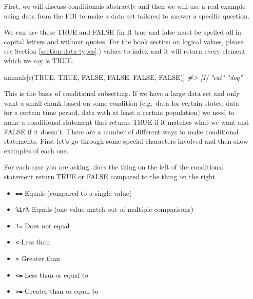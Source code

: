 \documentclass[
]{krantz}
\makeatletter
\newenvironment{Shaded}{\begin{snugshade}}{\end{snugshade}}
\newcommand{\CommentTok}[1]{\textcolor[rgb]{0.37,0.37,0.37}{\textit{#1}}}
\newcommand{\ConstantTok}[1]{\textcolor[rgb]{0,0,0}{#1}}
\newcommand{\FunctionTok}[1]{\textcolor[rgb]{0,0,0}{#1}}
\newcommand{\NormalTok}[1]{#1}
\providecommand{\tightlist}{%
  \setlength{\itemsep}{0pt}\setlength{\parskip}{0pt}}
\newenvironment{kframe}{%
\medskip{}
\setlength{\fboxsep}{.8em}
 \def\at@end@of@kframe{}%
 \ifinner\ifhmode%
  \def\at@end@of@kframe{\end{minipage}}%
  \begin{minipage}{\columnwidth}%
 \fi\fi%
 \def\FrameCommand##1{\hskip\@totalleftmargin \hskip-\fboxsep
 \colorbox{shadecolor}{##1}\hskip-\fboxsep
     \hskip-\linewidth \hskip-\@totalleftmargin \hskip\columnwidth}%
 \MakeFramed {\advance\hsize-\width
   \@totalleftmargin\z@ \linewidth\hsize
   \@setminipage}}%
 {\par\unskip\endMakeFramed%
 \at@end@of@kframe}
\renewenvironment{Shaded}{\begin{kframe}}{\end{kframe}}
\makeatother
\begin{document}
First, we will discuss conditionals abstractly and then we will use a real example using data from the FBI to make a data set tailored to answer a specific question.

We can use these TRUE and FALSE (in R true and false must be spelled all in capital letters and without quotes. For the book section on logical values, please see Section \ref{section-data-types}.) values to index and it will return every element which we say is TRUE.

\begin{Shaded}
\begin{Highlighting}[]
\NormalTok{animals[}\FunctionTok{c}\NormalTok{(}\ConstantTok{TRUE}\NormalTok{, }\ConstantTok{TRUE}\NormalTok{, }\ConstantTok{FALSE}\NormalTok{, }\ConstantTok{FALSE}\NormalTok{, }\ConstantTok{FALSE}\NormalTok{, }\ConstantTok{FALSE}\NormalTok{)]}
\CommentTok{\#\textgreater{} [1] "cat" "dog"}
\end{Highlighting}
\end{Shaded}

This is the basis of conditional subsetting. If we have a large data set and only want a small chunk based on some condition (e.g.~data for certain states, data for a certain time period, data with at least a certain population) we need to make a conditional statement that returns TRUE if it matches what we want and FALSE if it doesn't. There are a number of different ways to make conditional statements. First let's go through some special characters involved and then show examples of each one.

For each case you are asking: does the thing on the left of the conditional statement return TRUE or FALSE compared to the thing on the right.

\begin{itemize}
\tightlist
\item
  \texttt{==} Equals (compared to a single value)
\item
  \texttt{\%in\%} Equals (one value match out of multiple comparisons)
\item
  \texttt{!=} Does not equal
\item
  \texttt{\textless{}} Less than
\item
  \texttt{\textgreater{}} Greater than
\item
  \texttt{\textless{}=} Less than or equal to
\item
  \texttt{\textgreater{}=} Greater than or equal to
\end{itemize}
\end{document}
